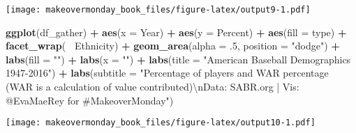 \documentclass[]{book}
\newenvironment{Shaded}{\begin{snugshade}}{\end{snugshade}}
\newcommand{\KeywordTok}[1]{\textcolor[rgb]{0.13,0.29,0.53}{\textbf{#1}}}
\newcommand{\DataTypeTok}[1]{\textcolor[rgb]{0.13,0.29,0.53}{#1}}
\newcommand{\DecValTok}[1]{\textcolor[rgb]{0.00,0.00,0.81}{#1}}
\newcommand{\CharTok}[1]{\textcolor[rgb]{0.31,0.60,0.02}{#1}}
\newcommand{\StringTok}[1]{\textcolor[rgb]{0.31,0.60,0.02}{#1}}
\newcommand{\OperatorTok}[1]{\textcolor[rgb]{0.81,0.36,0.00}{\textbf{#1}}}
\newcommand{\NormalTok}[1]{#1}
\theoremstyle{definition}
\theoremstyle{definition}
\theoremstyle{definition}
\theoremstyle{remark}
\begin{document}
\texttt{[image: makeovermonday\_book\_files/figure-latex/output9-1.pdf]}

\clearpage

\begin{Shaded}
\begin{Highlighting}[]
\KeywordTok{ggplot}\NormalTok{(df_gather) }\OperatorTok{+}
\StringTok{  }\KeywordTok{aes}\NormalTok{(}\DataTypeTok{x =}\NormalTok{ Year) }\OperatorTok{+}
\StringTok{  }\KeywordTok{aes}\NormalTok{(}\DataTypeTok{y =}\NormalTok{ Percent) }\OperatorTok{+}
\StringTok{  }\KeywordTok{aes}\NormalTok{(}\DataTypeTok{fill =}\NormalTok{ type) }\OperatorTok{+}
\StringTok{  }\KeywordTok{facet_wrap}\NormalTok{(}\OperatorTok{~}\StringTok{ }\NormalTok{Ethnicity) }\OperatorTok{+}
\StringTok{  }\KeywordTok{geom_area}\NormalTok{(}\DataTypeTok{alpha =}\NormalTok{ .}\DecValTok{5}\NormalTok{, }\DataTypeTok{position =} \StringTok{"dodge"}\NormalTok{) }\OperatorTok{+}
\StringTok{  }\KeywordTok{labs}\NormalTok{(}\DataTypeTok{fill =} \StringTok{""}\NormalTok{) }\OperatorTok{+}
\StringTok{  }\KeywordTok{labs}\NormalTok{(}\DataTypeTok{x =} \StringTok{""}\NormalTok{) }\OperatorTok{+}
\StringTok{  }\KeywordTok{labs}\NormalTok{(}\DataTypeTok{title =} \StringTok{"American Baseball Demographics 1947-2016"}\NormalTok{) }\OperatorTok{+}
\StringTok{  }\KeywordTok{labs}\NormalTok{(}\DataTypeTok{subtitle =} \StringTok{"Percentage of players and WAR percentage (WAR is a calculation of value contributed)}\CharTok{\textbackslash{}n}\StringTok{Data: SABR.org | Vis: @EvaMaeRey for #MakeoverMonday"}\NormalTok{) }
\end{Highlighting}
\end{Shaded}

\texttt{[image: makeovermonday\_book\_files/figure-latex/output10-1.pdf]}

\clearpage
\end{document}
